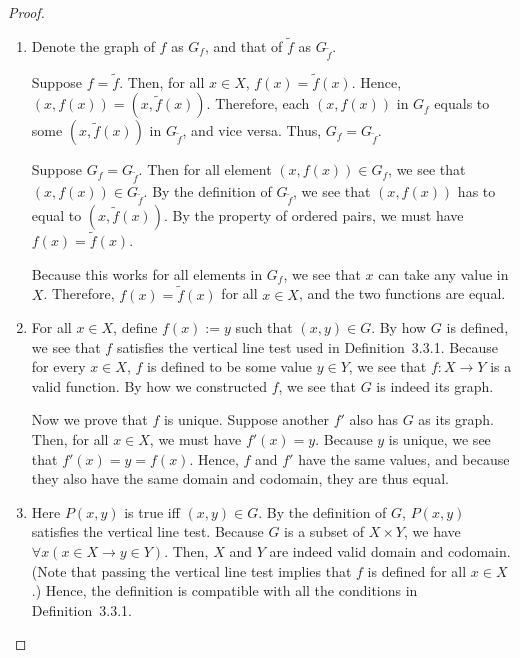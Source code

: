 \begin{proof}\leavevmode
	\begin{enumerate}
		\item 
		Denote the graph of $f$ as $G_f$, and that of $\tilde{f}$ as $G_{\tilde{f}}$.
		
		\myifbox Suppose $f = \tilde{f}$. Then, for all $x \in X$, $f(x) = \tilde{f}(x)$. Hence, $(x,f(x)) = (x,\tilde{f}(x))$. Therefore, each $(x,f(x))$ in $G_f$ equals to some $(x,\tilde{f}(x))$ in $G_{\tilde{f}}$, and vice versa. Thus, $G_f = G_{\tilde{f}}$.
		
		\myoifbox Suppose $G_f = G_{\tilde{f}}$. Then for all element $(x,f(x)) \in G_f$, we see that $(x,f(x)) \in G_{\tilde{f}}$. By the definition of $G_{\tilde{f}}$, we see that $(x,f(x))$ has to equal to $(x,\tilde{f}(x))$. By the property of ordered pairs, we must have $f(x) = \tilde{f}(x)$.
		
		Because this works for all elements in $G_f$, we see that $x$ can take any value in $X$. Therefore, $f(x) = \tilde{f}(x)$ for all $x \in X$, and the two functions are equal.
		
		\item For all $x \in X$, define $f(x) := y$ such that $(x,y) \in G$. By how $G$ is defined, we see that $f$ satisfies the vertical line test used in Definition~3.3.1. Because for every $x \in X$, $f$ is defined to be some value $y \in Y$, we see that $f: X \to Y$ is a valid function. By how we constructed $f$, we see that $G$ is indeed its graph.
		
		Now we prove that $f$ is unique. Suppose another $f'$ also has $G$ as its graph. Then, for all $x \in X$, we must have $f'(x) = y$. Because $y$ is unique, we see that $f'(x) = y = f(x)$. Hence, $f$ and $f'$ have the same values, and because they also have the same domain and codomain, they are thus equal.
		
		\item Here $P(x,y)$ is true iff $(x,y) \in G$. By the definition of $G$, $P(x,y)$ satisfies the vertical line test. Because $G$ is a subset of $X \times Y$, we have $\forall x(x \in X \to y \in Y)$. Then, $X$ and $Y$ are indeed valid domain and codomain. (Note that passing the vertical line test implies that $f$ is defined for all $x \in X$.) Hence, the definition is compatible with all the conditions in Definition~3.3.1.
	\end{enumerate}
\end{proof}

